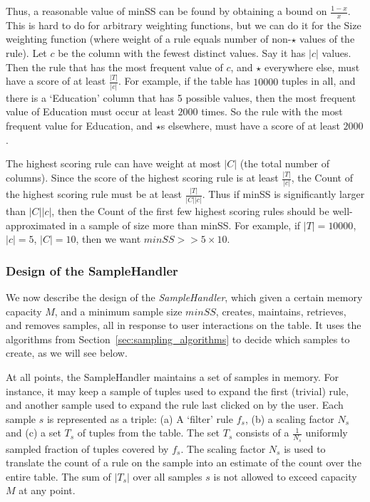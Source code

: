 {Thus, a reasonable value of minSS can be found by obtaining a bound on $\frac{1-x}{x}$. This is hard to do for arbitrary weighting functions, but we can do it for the Size weighting function (where weight of a rule equals number of non-$\star$ values of the rule). Let $c$ be the column with the fewest distinct values. Say it has $|c|$ values. Then the rule that has the most frequent value of $c$, and $\star$ everywhere else, must have a score of at least $\frac{|T|}{|c|}$. For example, if the table has $10000$ tuples in all, and there is a `Education' column that has 5 possible values, then the most frequent value of Education must occur at least $2000$ times. So the rule with the most frequent value for Education, and $\star$s elsewhere, must have a score of at least $2000$. 

The highest scoring rule can have weight at most $|C|$ (the total number of columns). Since the score of the highest scoring rule is at least $\frac{|T|}{|c|}$, the Count of the highest scoring rule must be at least $\frac{|T|}{|C||c|}$. Thus if minSS is significantly larger than $|C||c|$, then the Count of the first few highest scoring rules should be well-approximated in a sample of size more than minSS. For example, if $|T| = 10000$, $|c| = 5$, $|C| = 10$, then we want $minSS >> 5 \times 10$.
}



\subsubsection{Design of the SampleHandler}\label{sec:sample-handler}
We now describe the design of the {\em SampleHandler}, which given
a certain memory capacity $M$, and a minimum sample size $minSS$,
creates, maintains, retrieves, and removes samples, all in
response to user interactions on the table.
It uses the algorithms from Section~\ref{sec:sampling_algorithms} 
to decide which samples to create, as we will see below.

At all points, the SampleHandler maintains a set of samples in memory. For instance, it may keep a sample of tuples used to expand the first (trivial) rule, and another sample used to expand the rule last clicked on by the user. 
Each sample $s$ is represented as a triple: (a) A `filter' rule $f_s$, (b) a scaling factor $N_s$ and (c) a set $T_s$ of tuples from the table. The set $T_s$ consists of a $\frac{1}{N_s}$ uniformly sampled fraction of tuples covered by $f_s$. The scaling factor $N_s$ is used to translate the count of a rule on the sample into an estimate of the count over the entire table. The sum of $|T_s|$ over all samples $s$ is not allowed to exceed capacity $M$ at any point. 

